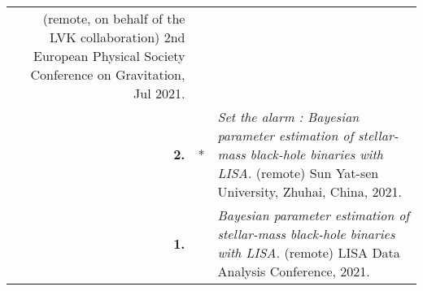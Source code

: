 {\begin{longtable}{rp{0.3cm}p{15.8cm}}
(remote, on behalf of the LVK collaboration) 2nd European Physical Society Conference on Gravitation, Jul 2021.
\vspace{0.05cm}\\
%
\textbf{2.} & * & \textit{Set the alarm : Bayesian parameter estimation of stellar-mass black-hole binaries with LISA.}
\newline{}
(remote) Sun Yat-sen University, Zhuhai, China, 2021.
\vspace{0.05cm}\\
%
\textbf{1.} &  & \textit{Bayesian parameter estimation of stellar-mass black-hole binaries with LISA.}
\newline{}
(remote) LISA Data Analysis Conference, 2021.
\vspace{0.05cm}\\
%
\end{longtable} }